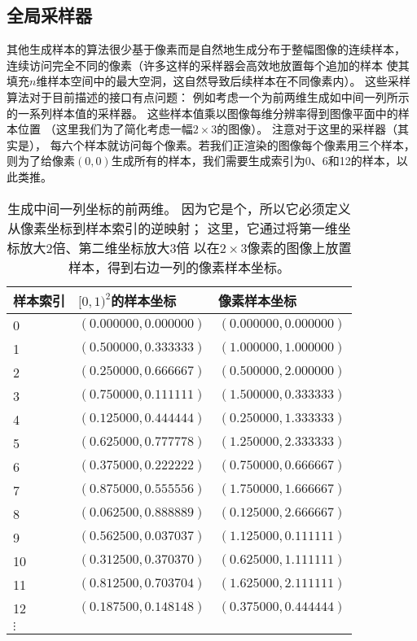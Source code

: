 \subsection{全局采样器}\label{sub:全局采样器}
其他生成样本的算法很少基于像素而是自然地生成分布于整幅图像的连续样本，
连续访问完全不同的像素（许多这样的采样器会高效地放置每个追加的样本
使其填充$n$维样本空间中的最大空洞，这自然导致后续样本在不同像素内）。
这些采样算法对于目前描述的接口有点问题：
例如考虑一个为前两维生成如中间一列所示的一系列样本值的采样器。
这些样本值乘以图像每维分辨率得到图像平面中的样本位置
（这里我们为了简化考虑一幅$2\times3$的图像）。
注意对于这里的采样器（其实是），
每六个样本就访问每个像素。若我们正渲染的图像每个像素用三个样本，
则为了给像素$(0,0)$生成所有的样本，我们需要生成索引为0、6和12的样本，以此类推。
\begin{table}[htb]
    \centering
    \begin{tabular}{lll}
        \toprule
        样本索引 & $[0,1)^2$的样本坐标   & 像素样本坐标          \\
        \midrule
        0        & $(0.000000,0.000000)$ & $(0.000000,0.000000)$ \\
        1        & $(0.500000,0.333333)$ & $(1.000000,1.000000)$ \\
        2        & $(0.250000,0.666667)$ & $(0.500000,2.000000)$ \\
        3        & $(0.750000,0.111111)$ & $(1.500000,0.333333)$ \\
        4        & $(0.125000,0.444444)$ & $(0.250000,1.333333)$ \\
        5        & $(0.625000,0.777778)$ & $(1.250000,2.333333)$ \\
        6        & $(0.375000,0.222222)$ & $(0.750000,0.666667)$ \\
        7        & $(0.875000,0.555556)$ & $(1.750000,1.666667)$ \\
        8        & $(0.062500,0.888889)$ & $(0.125000,2.666667)$ \\
        9        & $(0.562500,0.037037)$ & $(1.125000,0.111111)$ \\
        10       & $(0.312500,0.370370)$ & $(0.625000,1.111111)$ \\
        11       & $(0.812500,0.703704)$ & $(1.625000,2.111111)$ \\
        12       & $(0.187500,0.148148)$ & $(0.375000,0.444444)$ \\
        $\vdots$ &                       &                       \\
        \bottomrule
    \end{tabular}
    \caption{生成中间一列坐标的前两维。
        因为它是个，所以它必须定义从像素坐标到样本索引的逆映射；
        这里，它通过将第一维坐标放大2倍、第二维坐标放大3倍
        以在$2\times3$像素的图像上放置样本，得到右边一列的像素样本坐标。}
    \label{tab:7.2}
\end{table}

